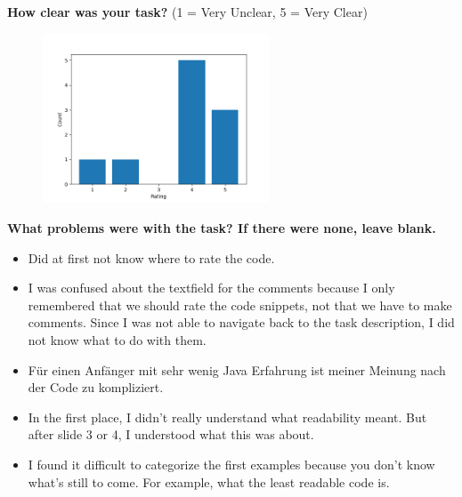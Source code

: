 \documentclass[%
class=scrreprt,
chapterprefix=false,%
open=right,%
twoside=false,%
paper=a4,%
logofile={Logo\_zentral\_farbig\_EN.png},%
thesistype=master,%
UKenglish,%
]{se2thesis}
\theoremstyle{definition}
\begin{document}
	\textbf{How clear was your task?} (1 = Very Unclear, 5 = Very Clear)
	\begin{figure}[h!]
		\centering
		\includegraphics[width=0.6\textwidth]{img/pilot_survey_task_clearness.png}
		\label{fig:pilot-task-clear}
	\end{figure}
	
	\textbf{What problems were with the task? If there were none, leave blank.}
	\begin{itemize}
		\item Did at first not know where to rate the code.
		\item I was confused about the textfield for the comments because I only remembered that we should rate the code snippets, not that we have to make comments. Since I was not able to navigate back to the task description, I did not know what to do with them.
		\item Für einen Anfänger mit sehr wenig Java Erfahrung ist meiner Meinung nach der Code zu kompliziert.
		\item In the first place, I didn't really understand what readability meant. But after slide 3 or 4, I understood what this was about.
		\item I found it difficult to categorize the first examples because you don't know what's still to come. For example, what the least readable code is.
	\end{itemize}
\end{document}
